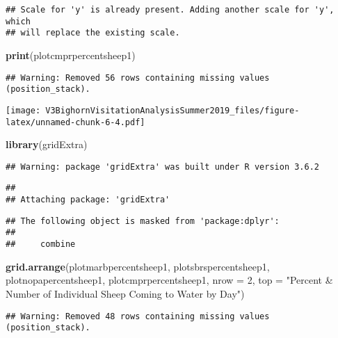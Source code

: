 \documentclass[]{article}
\newenvironment{Shaded}{\begin{snugshade}}{\end{snugshade}}
\newcommand{\DataTypeTok}[1]{\textcolor[rgb]{0.13,0.29,0.53}{#1}}
\newcommand{\DecValTok}[1]{\textcolor[rgb]{0.00,0.00,0.81}{#1}}
\newcommand{\KeywordTok}[1]{\textcolor[rgb]{0.13,0.29,0.53}{\textbf{#1}}}
\newcommand{\NormalTok}[1]{#1}
\newcommand{\StringTok}[1]{\textcolor[rgb]{0.31,0.60,0.02}{#1}}
\begin{document}
\begin{verbatim}
## Scale for 'y' is already present. Adding another scale for 'y', which
## will replace the existing scale.
\end{verbatim}

\begin{Shaded}
\begin{Highlighting}[]
\KeywordTok{print}\NormalTok{(plotcmprpercentsheep1)}
\end{Highlighting}
\end{Shaded}

\begin{verbatim}
## Warning: Removed 56 rows containing missing values (position_stack).
\end{verbatim}

\texttt{[image: V3BighornVisitationAnalysisSummer2019\_files/figure-latex/unnamed-chunk-6-4.pdf]}

\begin{Shaded}
\begin{Highlighting}[]
\KeywordTok{library}\NormalTok{(gridExtra)}
\end{Highlighting}
\end{Shaded}

\begin{verbatim}
## Warning: package 'gridExtra' was built under R version 3.6.2
\end{verbatim}

\begin{verbatim}
## 
## Attaching package: 'gridExtra'
\end{verbatim}

\begin{verbatim}
## The following object is masked from 'package:dplyr':
## 
##     combine
\end{verbatim}

\begin{Shaded}
\begin{Highlighting}[]
\KeywordTok{grid.arrange}\NormalTok{(plotmarbpercentsheep1, plotsbrspercentsheep1, plotnopapercentsheep1, plotcmprpercentsheep1, }\DataTypeTok{nrow =} \DecValTok{2}\NormalTok{, }\DataTypeTok{top =} \StringTok{"Percent & Number of Individual Sheep Coming to Water by Day"}\NormalTok{)}
\end{Highlighting}
\end{Shaded}

\begin{verbatim}
## Warning: Removed 48 rows containing missing values (position_stack).
\end{verbatim}
\end{document}
